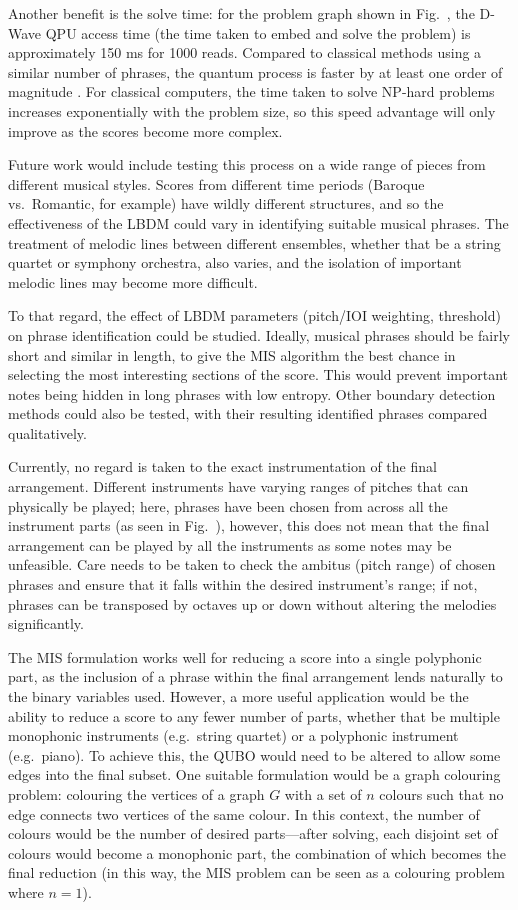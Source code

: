 \documentclass[12pt]{article}
\theoremstyle{definition}
\begin{document}
Another benefit is the solve time: for the problem graph shown in Fig.\  , the D-Wave QPU access time (the time taken to embed and solve the problem) is approximately 150 ms for 1000 reads. Compared to classical methods using a similar number of phrases, the quantum process is faster by at least one order of magnitude . For classical computers, the time taken to solve NP-hard problems increases exponentially with the problem size, so this speed advantage will only improve as the scores become more complex.

Future work would include testing this process on a wide range of pieces from different musical styles. Scores from different time periods (Baroque vs.\ Romantic, for example) have wildly different structures, and so the effectiveness of the LBDM could vary in identifying suitable musical phrases. The treatment of melodic lines between different ensembles, whether that be a string quartet or symphony orchestra, also varies, and the isolation of important melodic lines may become more difficult.

To that regard, the effect of LBDM parameters (pitch/IOI weighting, threshold) on phrase identification could be studied. Ideally, musical phrases should be fairly short and similar in length, to give the MIS algorithm the best chance in selecting the most interesting sections of the score. This would prevent important notes being hidden in long phrases with low entropy. Other boundary detection methods could also be tested, with their resulting identified phrases compared qualitatively.

Currently, no regard is taken to the exact instrumentation of the final arrangement. Different instruments have varying ranges of pitches that can physically be played; here, phrases have been chosen from across all the instrument parts (as seen in Fig.\  ), however, this does not mean that the final arrangement can be played by all the instruments as some notes may be unfeasible. Care needs to be taken to check the ambitus (pitch range) of chosen phrases and ensure that it falls within the desired instrument's range; if not, phrases can be transposed by octaves up or down without altering the melodies significantly.

The MIS formulation works well for reducing a score into a single polyphonic part, as the inclusion of a phrase within the final arrangement lends naturally to the binary variables used. However, a more useful application would be the ability to reduce a score to any fewer number of parts, whether that be multiple monophonic instruments (e.g.\ string quartet) or a polyphonic instrument (e.g.\ piano). To achieve this, the QUBO would need to be altered to allow some edges into the final subset. One suitable formulation would be a graph colouring problem: colouring the vertices of a graph $G$ with a set of $n$ colours such that no edge connects two vertices of the same colour. In this context, the number of colours would be the number of desired parts—after solving, each disjoint set of colours would become a monophonic part, the combination of which becomes the final reduction (in this way, the MIS problem can be seen as a colouring problem where $n=1$).
\end{document}
